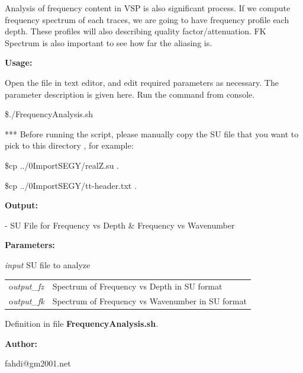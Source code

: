 \documentclass{article}
\begin{document}
\vspace{1pt}
Analysis of frequency content in VSP is also significant process. If we compute 
frequency spectrum of each traces, we are going to have frequency profile each 
depth. These profiles will also describing quality factor/attenuation. FK Spectrum 
is also important to see how far the aliasing is.

\vspace{4pt}
\textbf{Usage:}

\vspace{4pt}
Open the file in text editor, and edit required parameters as necessary. The parameter 
description is given here. Run the command from console. 

\vspace{16pt}
\$./FrequencyAnalysis.sh 

\vspace{16pt}
*** Before running the script, please manually copy the SU file that you want to 
pick to this directory , for example:

\vspace{4pt}
\$cp ../0ImportSEGY/realZ.su .

\vspace{4pt}
\$cp ../0ImportSEGY/tt-header.txt .

\vspace{16pt}
\textbf{Output:}

\vspace{4pt}
- SU File for Frequency vs Depth \& Frequency vs Wavenumber

\vspace{16pt}
\textbf{Parameters:}

\vspace{4pt}
\textit{input} SU file to analyze 

\vspace{4pt}
\begin{tabular}{|>{\raggedright}p{54pt}|>{\raggedright}p{245pt}|}
\hline
\tabularnewline
\hline
o\textit{utput\_fz}  & Spectrum of Frequency vs Depth in SU format \tabularnewline
\hline
o\textit{utput\_fk}  & Spectrum of Frequency vs Wavenumber in SU format \tabularnewline
\hline
\end{tabular}

\vspace{1pt}
Definition in file \textbf{FrequencyAnalysis.sh}.

\vspace{4pt}
\textbf{Author:}

\vspace{4pt}
\leftskip=18pt
fahdi@gm2001.net 
\end{document}
